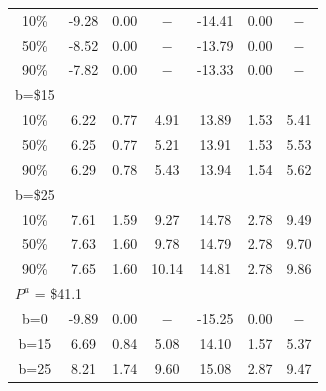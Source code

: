 \begin{tabular}[t]{ccccccc}
10\% & -9.28 & 0.00 &  $-$ & -14.41& 0.00& $-$ \\
50\% & -8.52 & 0.00 &  $-$ & -13.79& 0.00& $-$ \\
90\% & -7.82 & 0.00 &  $-$ & -13.33& 0.00& $-$ \\
b=\$15 &&&&&&\\
10\% & 6.22 & 0.77 & 4.91 & 13.89 & 1.53 & 5.41 \\
50\% & 6.25 & 0.77 & 5.21 & 13.91 & 1.53 & 5.53\\
90\% & 6.29 & 0.78 & 5.43 & 13.94 & 1.54  & 5.62\\
b=\$25 &&&&&&\\
10\% & 7.61 & 1.59 & 9.27  & 14.78 & 2.78 & 9.49 \\
50\% & 7.63 & 1.60 & 9.78  & 14.79 & 2.78 & 9.70 \\
90\% & 7.65 & 1.60 & 10.14 & 14.81 & 2.78 & 9.86\\
\midrule
\multicolumn{7}{l}{$P^a$ = \$41.1}  \\
b=0 &  -9.89 &   0.00 &       $-$ &-15.25 &   0.00 &       $-$ \\
b=15 &   6.69 &   0.84 &  5.08  &  14.10 &   1.57 &  5.37 \\
b=25 &   8.21 &   1.74 &  9.60 &  15.08 &   2.87 &  9.47 \\
\bottomrule
\end{tabular}
